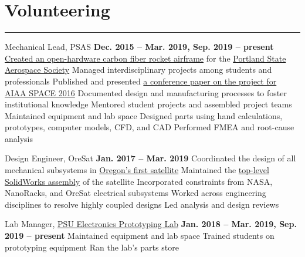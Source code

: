 \section{Volunteering}
\noindent\rule{\textwidth}{\hlinewidth}
	\begin{innerlist}
	\item Mechanical Lead, PSAS
		\hfill\textbf{Dec. 2015 -- Mar. 2019, Sep. 2019 -- present} 
		\subitem \href{https://github.com/psas/sw-cad-airframe-lv3.0}{Created 
			an open-hardware carbon fiber rocket airframe} for the 
			\href{http://psas.pdx.edu/}{Portland State Aerospace Society}
		\subitem Managed interdisciplinary projects among students and professionals
		\subitem Published and presented \href{http://arc.aiaa.org/doi/pdf/10.2514/6.2016-5365}{a conference paper on the project for AIAA SPACE 2016}
		\subitem Documented design and manufacturing processes to foster institutional knowledge
		\subitem Mentored student projects and assembled project teams
		\subitem Maintained equipment and lab space
		\subitem Designed parts using hand calculations, prototypes, computer models, CFD, and CAD
		\subitem Performed FMEA and root-cause analysis
	\item Design Engineer, OreSat 
		\hfill\textbf{Jan. 2017 -- Mar. 2019}
		\subitem Coordinated the design of all mechanical subsystems in \href{http://oresat.org/}{Oregon's first satellite}
		\subitem Maintained the \href{https://github.com/oresat/oresat-structure}{top-level SolidWorks assembly} of the satellite
		\subitem Incorporated constraints from NASA, NanoRacks, and OreSat electrical subsystems
		\subitem Worked across engineering disciplines to resolve highly coupled designs
		\subitem Led analysis and design reviews 
    \item Lab Manager, \href{https://psu-epl.github.io/}{PSU Electronics Prototyping Lab}
		\hfill\textbf{Jan. 2018 -- Mar. 2019, Sep. 2019 -- present}
		\subitem Maintained equipment and lab space
		\subitem Trained students on prototyping equipment
		\subitem Ran the lab's parts store
	\end{innerlist}

